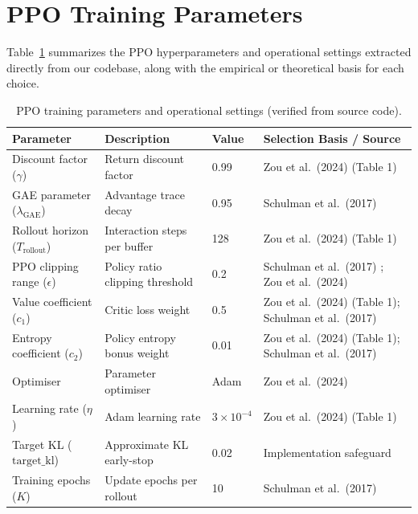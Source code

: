 \section{PPO Training Parameters}
Table~\ref{tab:hyperparameters} summarizes the PPO hyperparameters and operational settings extracted directly from our codebase, along with the empirical or theoretical basis for each choice.

\begin{table}[H]
\centering
\caption{PPO training parameters and operational settings (verified from source code).}
\label{tab:hyperparameters}
\renewcommand{\arraystretch}{1.02}
\footnotesize
\setlength{\tabcolsep}{4.5pt}
\begin{tabular}{@{}p{3.4cm}p{4.2cm}p{1.6cm}p{6.3cm}@{}}
\toprule
\textbf{Parameter} & \textbf{Description} & \textbf{Value} & \textbf{Selection Basis / Source} \\
\midrule
Discount factor ($\gamma$) & Return discount factor & 0.99 & Zou et al.\ (2024) \citep{zou2024novel} (Table 1) \\
GAE parameter ($\lambda_{\text{GAE}}$) & Advantage trace decay & 0.95 & Schulman et al.\ (2017) \citep{schulman2017proximal} \\
Rollout horizon ($T_{\text{rollout}}$) & Interaction steps per buffer & 128 & Zou et al.\ (2024) \citep{zou2024novel} (Table 1) \\
PPO clipping range ($\epsilon$) & Policy ratio clipping threshold & 0.2 & Schulman et al.\ (2017) \citep{schulman2017proximal}; Zou et al.\ (2024) \citep{zou2024novel} \\
Value coefficient ($c_1$) & Critic loss weight & 0.5 & Zou et al.\ (2024) \citep{zou2024novel} (Table 1); Schulman et al.\ (2017) \\
Entropy coefficient ($c_2$) & Policy entropy bonus weight & 0.01 & Zou et al.\ (2024) \citep{zou2024novel} (Table 1); Schulman et al.\ (2017) \\
Optimiser & Parameter optimiser & Adam & Zou et al.\ (2024) \citep{zou2024novel} \\
Learning rate ($\eta$) & Adam learning rate & $3 \times 10^{-4}$ & Zou et al.\ (2024) \citep{zou2024novel} (Table 1) \\
Target KL ($\text{target\_kl}$) & Approximate KL early-stop & 0.02 & Implementation safeguard \citep{schulman2017proximal} \\
Training epochs ($K$) & Update epochs per rollout & 10 & Schulman et al.\ (2017) \citep{schulman2017proximal} \\

\end{tabular}
\end{table}
